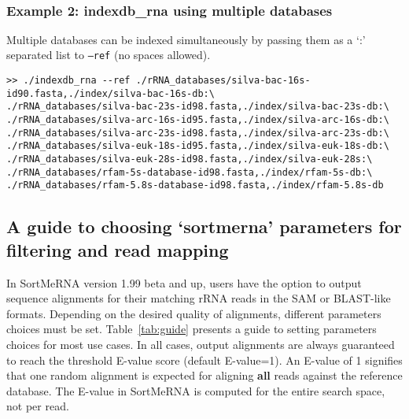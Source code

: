 \documentclass[10pt,a4paper]{article}
\begin{document}
~\\

\subsubsection{Example 2: indexdb\_rna using multiple databases}

Multiple databases can be indexed simultaneously by passing them as a `:' separated list to \texttt{--ref} (no spaces allowed). 

\begin{Verbatim}[fontsize=\footnotesize]
>> ./indexdb_rna --ref ./rRNA_databases/silva-bac-16s-id90.fasta,./index/silva-bac-16s-db:\
./rRNA_databases/silva-bac-23s-id98.fasta,./index/silva-bac-23s-db:\
./rRNA_databases/silva-arc-16s-id95.fasta,./index/silva-arc-16s-db:\
./rRNA_databases/silva-arc-23s-id98.fasta,./index/silva-arc-23s-db:\
./rRNA_databases/silva-euk-18s-id95.fasta,./index/silva-euk-18s-db:\
./rRNA_databases/silva-euk-28s-id98.fasta,./index/silva-euk-28s:\
./rRNA_databases/rfam-5s-database-id98.fasta,./index/rfam-5s-db:\
./rRNA_databases/rfam-5.8s-database-id98.fasta,./index/rfam-5.8s-db
\end{Verbatim}

\newpage
\subsection{A guide to choosing `{\bf sortmerna}' parameters for filtering and read mapping}

In SortMeRNA version 1.99 beta and up, users have the option to output sequence alignments for their matching rRNA reads in
the SAM or BLAST-like formats. Depending on the desired quality of alignments, different parameters choices must be set. 
Table~\ref{tab:guide} presents a guide to setting parameters choices for most use cases. In all cases, output alignments are always guaranteed to reach
the threshold E-value score (default E-value=1). An E-value of 1 signifies that one random alignment is expected for aligning
\textbf{all} reads against the reference database. The E-value in SortMeRNA is computed for the entire search space, not per read.
\end{document}
